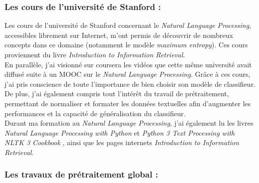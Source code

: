             \subsubsection{Les cours de l'université de Stanford :}
                Les cours de l’université de Stanford concernant le \textit{Natural Language Processing}, accessibles librement sur Internet, m'ont permis de découvrir de nombreux concepts dans ce domaine (notamment le modèle \textit{maximum entropy}). Ces cours proviennent du livre \textit{Introduction to Information Retrieval}\autocite{ir_web}.\\

                En parallèle, j'ai visionné sur coursera les vidéos que cette même université avait diffusé suite à un MOOC sur le \textit{Natural Language Processing}. Grâce à ces cours, j'ai pris conscience de toute l'importance de bien choisir son modèle de classifieur. De plus, j'ai également compris tout l'intérêt du travail de prétraitement, permettant de normaliser et formater les données textuelles afin d'augmenter les performances et la capacité de généralisation du classifieur.\\

                Durant ma formation au \textit{Natural Language Processing}, j'ai également lu les livres \textit{Natural Language Processing with Python}\autocite{nlp_p} et \textit{Python 3 Text Processing with NLTK 3 Cookbook}\autocite{nltk} , ainsi que les pages internets \textit{Introduction to Information Retrieval}\autocite{ir_web}.

            \subsubsection{Les travaux de prétraitement global :}
